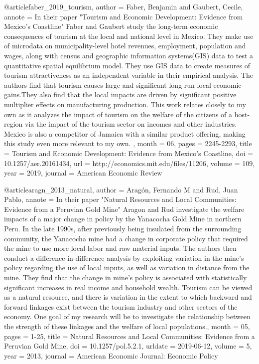 
@article{faber_2019_tourism,
	author = {Faber, Benjamin and Gaubert, Cecile},
	annote = {In their paper "Tourism and Economic Development: Evidence from Mexico's Coastline" Faber and Gaubert study the long-term economic consequences of tourism at the local and national level in Mexico. They make use of microdata on municipality-level hotel revenues, employment, population and wages, along with census and geographic information systems(GIS) data to test a quantitative spatial equilibrium model. They use GIS data to create measures of tourism attractiveness as an independent variable in their empirical analysis. The authors find that tourism causes large and significant long-run local economic gains.They also find that the local impacts are driven by significant positive multiplier effects on manufacturing production. This work relates closely to my own as it analyzes the impact of tourism on the welfare of the citizens of a host-region via the impact of the tourism sector on incomes and other industries. Mexico is also a competitor of Jamaica with a similar product offering, making this study even more relevant to my own. },
	month = {06},
	pages = {2245-2293},
	title = {Tourism and Economic Development: Evidence from Mexico’s Coastline},
	doi = {10.1257/aer.20161434},
	url = {http://economics.mit.edu/files/11206},
	volume = {109},
	year = {2019},
	journal = {American Economic Review}
}

@article{aragn_2013_natural,
	author = {Aragón, Fernando M and Rud, Juan Pablo},
	annote = {In their paper "Natural Resources and Local Communities: Evidence from a Peruvian Gold Mine" Aragon and Rud investigate the welfare impacts of a major change in policy by the Yanacocha Gold Mine in northern Peru. In the late 1990s, after previously being insulated from the surrounding community, the Yanacocha mine had a change in corporate policy that required the mine to use more local labor and raw material inputs. The authors then conduct a difference-in-difference analysis by exploiting variation in the mine's policy regarding the use of local inputs, as well as variation in distance from the mine. They find that the change in mine's policy is associated with statistically significant increases in real income and household wealth. Tourism can be viewed as a natural resource, and there is variation in the extent to which backward and forward linkages exist between the tourism industry and other sectors of the economy. One goal of my research will be to investigate the relationship between the strength of these linkages and the welfare of local populations.},
	month = {05},
	pages = {1-25},
	title = {Natural Resources and Local Communities: Evidence from a Peruvian Gold Mine},
	doi = {10.1257/pol.5.2.1},
	urldate = {2019-06-12},
	volume = {5},
	year = {2013},
	journal = {American Economic Journal: Economic Policy}
}

